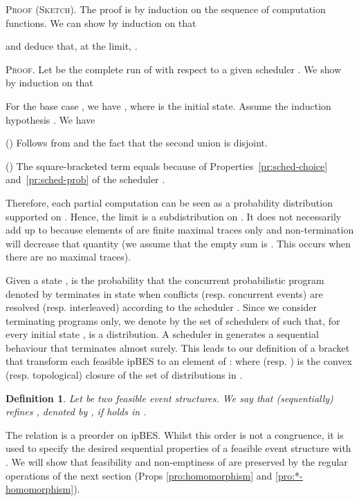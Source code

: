 \documentclass[review]{elsart}
\newtheorem{definition}{Definition}[section]
\newenvironment{proof}{\par
\noindent
\textsc{Proof. }
\noindent}{\hfill}
\newenvironment{proofsummary}{\par
\noindent
\textsc{Proof (Sketch). }
\noindent}{\hfill}
\begin{document}
\begin{proofsummary}
The proof is by induction on the sequence of computation functions. We can show by induction on  that 

and deduce that, at the limit, .
\end{proofsummary}

\begin{proof}
Let  be the complete run of  with respect to a given scheduler . We show by induction on  that

For the base case , we have , where  is the initial state. Assume the induction hypothesis . We have
 
() Follows from  and the fact that the second union is disjoint.

() The square-bracketed term equals  because of Properties~\ref{pr:sched-choice} and~\ref{pr:sched-prob} of the scheduler .


Therefore, each partial computation  can be seen as a probability distribution  supported on . Hence, the limit is a subdistribution  on . It does not necessarily add up to  because elements of  are finite maximal traces only and non-termination will decrease that quantity (we assume that the empty sum is . This occurs when there are no maximal traces).
\end{proof}

Given a state ,  is the probability that the concurrent probabilistic program denoted by  terminates in state  when conflicts (resp. concurrent events) are resolved (resp. interleaved) according to the scheduler . Since we consider terminating programs only, we denote by  the set of schedulers of  such that, for every initial state ,  is a distribution. A scheduler in   generates a sequential behaviour that terminates almost surely. This leads to our definition of a bracket  that transform each feasible ipBES to an element of : 
where  (resp. ) is the convex (resp. topological) closure of the set of distributions  in . 

\begin{definition}\label{def:semantics-sequential}
Let  be two feasible event structures. We say that  (sequentially) refines , denoted by , if  holds in .
\end{definition}

The relation  is a preorder on ipBES. Whilst this order is not a congruence, it is used to specify the desired sequential properties of a feasible event structure  with . We will show that feasibility and non-emptiness of  are preserved by the regular operations of the next section (Props \ref{pro:homomorphism} and \ref{pro:*-homomorphism}).
\end{document}
